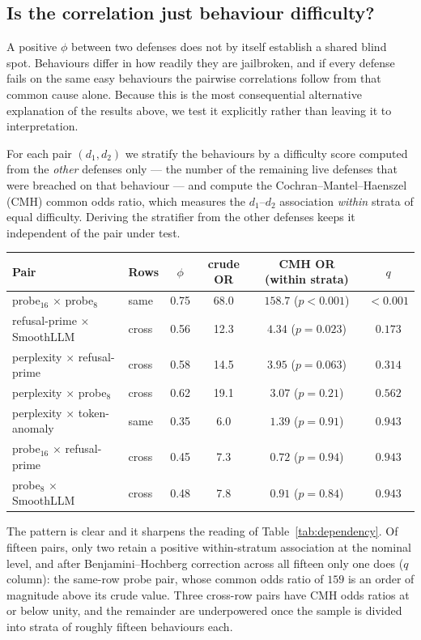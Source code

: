\subsection{Is the correlation just behaviour difficulty?}
\label{sec:confound}

A positive $\phi$ between two defenses does not by itself establish a shared blind spot.
Behaviours differ in how readily they are jailbroken, and if every defense fails on the same
easy behaviours the pairwise correlations follow from that common cause alone. Because this
is the most consequential alternative explanation of the results above, we test it
explicitly rather than leaving it to interpretation.

For each pair $(d_1,d_2)$ we stratify the behaviours by a difficulty score computed from the
\emph{other} defenses only --- the number of the remaining live defenses that were breached
on that behaviour --- and compute the Cochran--Mantel--Haenszel (CMH) common odds ratio,
which measures the $d_1$--$d_2$ association \emph{within} strata of equal difficulty.
Deriving the stratifier from the other defenses keeps it independent of the pair under test.

\begin{center}
\begin{tabular}{llcccc}
\toprule
Pair & Rows & $\phi$ & crude OR & CMH OR (within strata) & $q$ \\
\midrule
probe$_{16}$ $\times$ probe$_{8}$   & same  & 0.75 & 68.0 & $\mathbf{158.7}$ ($p<0.001$) & $\mathbf{<0.001}$ \\
refusal-prime $\times$ SmoothLLM    & cross & 0.56 & 12.3 & $4.34$ ($p=0.023$) & $0.173$ \\
perplexity $\times$ refusal-prime   & cross & 0.58 & 14.5 & $3.95$ ($p=0.063$) & $0.314$ \\
perplexity $\times$ probe$_{8}$     & cross & 0.62 & 19.1 & $3.07$ ($p=0.21$)  & $0.562$ \\
perplexity $\times$ token-anomaly   & same  & 0.35 & 6.0  & $1.39$ ($p=0.91$)  & $0.943$ \\
probe$_{16}$ $\times$ refusal-prime & cross & 0.45 & 7.3  & $0.72$ ($p=0.94$)  & $0.943$ \\
probe$_{8}$ $\times$ SmoothLLM      & cross & 0.48 & 7.8  & $0.91$ ($p=0.84$)  & $0.943$ \\
\bottomrule
\end{tabular}
\end{center}

The pattern is clear and it sharpens the reading of Table~\ref{tab:dependency}. Of fifteen
pairs, only two retain a positive within-stratum association at the nominal level, and
after Benjamini--Hochberg correction across all fifteen only one does ($q$ column): the
same-row probe pair, whose common odds ratio of $159$ is an
order of magnitude above its crude value. Three cross-row pairs have CMH odds ratios at or
below unity, and the remainder are underpowered once the sample is divided into strata of
roughly fifteen behaviours each.

